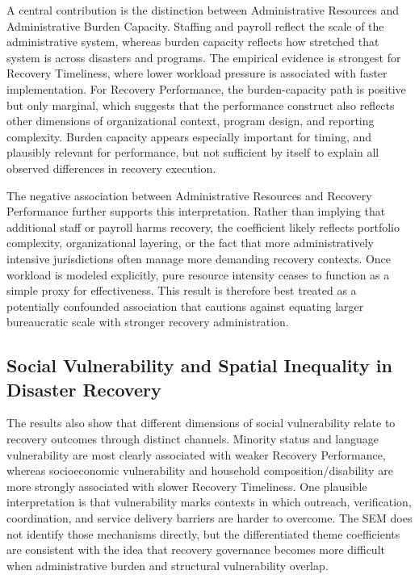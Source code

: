 \documentclass[
  number]{elsarticle}
\begin{document}
A central contribution is the distinction between Administrative
Resources and Administrative Burden Capacity. Staffing and payroll
reflect the scale of the administrative system, whereas burden capacity
reflects how stretched that system is across disasters and programs. The
empirical evidence is strongest for Recovery Timeliness, where lower
workload pressure is associated with faster implementation. For Recovery
Performance, the burden-capacity path is positive but only marginal,
which suggests that the performance construct also reflects other
dimensions of organizational context, program design, and reporting
complexity. Burden capacity appears especially important for timing, and
plausibly relevant for performance, but not sufficient by itself to
explain all observed differences in recovery execution.

The negative association between Administrative Resources and Recovery
Performance further supports this interpretation. Rather than implying
that additional staff or payroll harms recovery, the coefficient likely
reflects portfolio complexity, organizational layering, or the fact that
more administratively intensive jurisdictions often manage more
demanding recovery contexts. Once workload is modeled explicitly, pure
resource intensity ceases to function as a simple proxy for
effectiveness. This result is therefore best treated as a potentially
confounded association that cautions against equating larger
bureaucratic scale with stronger recovery administration.

\subsection{Social Vulnerability and Spatial Inequality in Disaster
Recovery}\label{social-vulnerability-and-spatial-inequality-in-disaster-recovery}

The results also show that different dimensions of social vulnerability
relate to recovery outcomes through distinct channels. Minority status
and language vulnerability are most clearly associated with weaker
Recovery Performance, whereas socioeconomic vulnerability and household
composition/disability are more strongly associated with slower Recovery
Timeliness. One plausible interpretation is that vulnerability marks
contexts in which outreach, verification, coordination, and service
delivery barriers are harder to overcome. The SEM does not identify
those mechanisms directly, but the differentiated theme coefficients are
consistent with the idea that recovery governance becomes more difficult
when administrative burden and structural vulnerability overlap.
\end{document}
